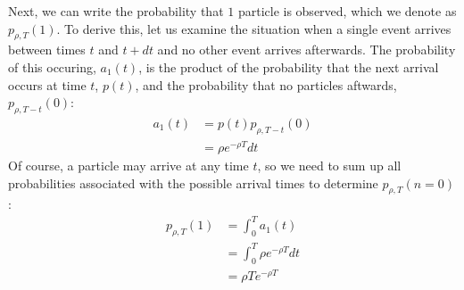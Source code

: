 \documentclass{article}
\begin{document}
Next, we can write the probability that $1$ particle is observed, which
we denote as $p_{\rho, T}(1)$.  To derive this, let us examine the situation
when a single event arrives between times $t$ and $t + dt$
and no other event arrives afterwards.
The probability of this occuring, $a_1(t)$, is the product of the probability
that the next arrival occurs at time $t$, $p(t)$, and the probability
that no particles aftwards, $p_{\rho, T - t}(0)$:
\begin{align}
	a_1(t) &= p(t) p_{\rho, T - t}(0)\nonumber\\
			 &= \rho e^{-\rho T}dt\nonumber
\end{align}
Of course, a particle may arrive at any time $t$, so 
we need to sum up all probabilities associated
with the possible
arrival times to determine $p_{\rho, T}(n = 0)$:
\begin{align}
	p_{\rho, T}(1) &= \int_0^T a_1(t)\nonumber\\
	               &= \int_0^T \rho e^{-\rho T} dt\nonumber\\
								 &= \rho T e^{-\rho T}
\end{align}
\end{document}
